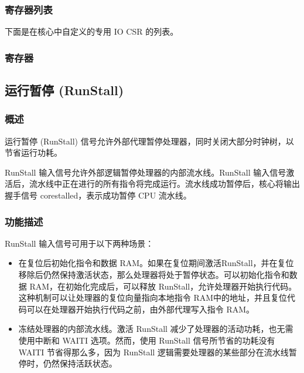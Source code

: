 \documentclass[main\_\_CN.tex]{subfiles}
\begin{document}
\newpage
\hypertarget{riscvcpu-fastio-reg-summ}{}
\subsubsection{寄存器列表}
\label{sec:riscvcpu-fastio-reg-summ}


下面是在核心中自定义的专用 IO CSR 的列表。




\subsubsection{寄存器}
\label{sec:riscvcpu-fastio-reg-desc}



\newpage
\subsection{运行暂停 (RunStall)}
\label{sec:riscvcpu-custom-runstall}
\subsubsection{概述}
\label{sec:riscvcpu-custom-runstall-overview}

运行暂停 (RunStall) 信号允许外部代理暂停处理器，同时关闭大部分时钟树，以节省运行功耗。

RunStall 输入信号允许外部逻辑暂停处理器的内部流水线。RunStall 输入信号激活后，流水线中正在进行的所有指令将完成运行。流水线成功暂停后，核心将输出握手信号 corestalled，表示成功暂停 CPU 流水线。


\subsubsection{功能描述}
\label{sec:riscvcpu-custom-runstall-feature-func-descr}

RunStall 输入信号可用于以下两种场景：
\begin{itemize}
    \item 在复位后初始化指令和数据 RAM。如果在复位期间激活RunStall，并在复位移除后仍然保持激活状态，那么处理器将处于暂停状态。可以初始化指令和数据 RAM，在初始化完成后，可以释放 RunStall，允许处理器开始执行代码。这种机制可以让处理器的复位向量指向本地指令 RAM中的地址，并且复位代码可以在处理器开始执行代码之前，由外部代理写入指令 RAM。
    \item 冻结处理器的内部流水线。激活 RunStall 减少了处理器的活动功耗，也无需使用中断和 WAITI 选项。然而，使用 RunStall 信号所节省的功耗没有 WAITI 节省得那么多，因为 RunStall 逻辑需要处理器的某些部分在流水线暂停时，仍然保持活跃状态。
\end{itemize}
\end{document}
